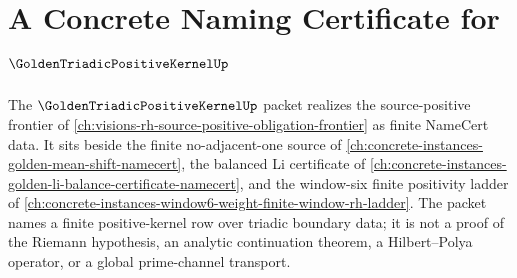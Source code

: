 \chapter{A Concrete Naming Certificate for $\GoldenTriadicPositiveKernelUp$}
\label{ch:concrete-instances-golden-triadic-positive-kernel-namecert}

The $\GoldenTriadicPositiveKernelUp$ packet realizes the source-positive frontier of \autoref{ch:visions-rh-source-positive-obligation-frontier} as finite NameCert data. It sits beside the finite no-adjacent-one source of \autoref{ch:concrete-instances-golden-mean-shift-namecert}, the balanced Li certificate of \autoref{ch:concrete-instances-golden-li-balance-certificate-namecert}, and the window-six finite positivity ladder of \autoref{ch:concrete-instances-window6-weight-finite-window-rh-ladder}. The packet names a finite positive-kernel row over triadic boundary data; it is not a proof of the Riemann hypothesis, an analytic continuation theorem, a Hilbert--Polya operator, or a global prime-channel transport.

